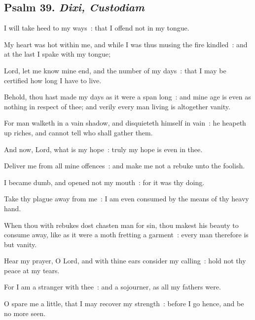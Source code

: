 \subsection{Psalm 39. \textit{Dixi, Custodiam}}


 I will take heed to my ways~: that I offend not in my tongue.\par
{}
My heart was hot within me, and while I was thus musing the fire kindled~: and at the last I spake with my tongue;\par
{}Lord, let me know mine end, and the number of my days~: that I may be certified how long I have to live.\par
{}Behold, thou hast made my days as it were a span long~: and mine age is even as nothing in respect of thee; and verily every man living is altogether vanity.\par
{}For man walketh in a vain shadow, and disquieteth himself in vain~: he heapeth up riches, and cannot tell who shall gather them.\par
{}And now, Lord, what is my hope~: truly my hope is even in thee.\par
{}Deliver me from all mine offences~: and make me not a rebuke unto the foolish.\par
{}I became dumb, and opened not my mouth~: for it was thy doing.\par
{}Take thy plague away from me~: I am even consumed by the means of thy heavy hand.\par
{}When thou with rebukes dost chasten man for sin, thou makest his beauty to consume away, like as it were a moth fretting a garment~: every man therefore is but vanity.\par
{}Hear my prayer, O Lord, and with thine ears consider my calling~: hold not thy peace at my tears.\par
{}For I am a stranger with thee~: and a sojourner, as all my fathers were.\par
{}O spare me a little, that I may recover my strength~: before I go hence, and be no more seen.\par

